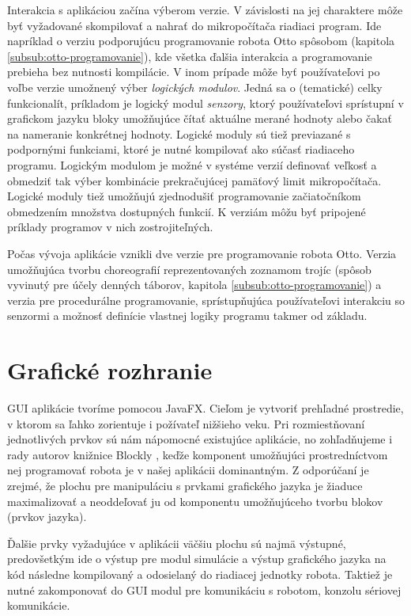 Interakcia s aplikáciou začína výberom verzie. V závislosti na jej charaktere môže byť vyžadované skompilovať a nahrať do mikropočítača riadiaci program. Ide napríklad o verziu podporujúcu programovanie robota Otto spôsobom  (kapitola \ref{subsub:otto-programovanie}), kde všetka ďalšia interakcia a programovanie prebieha bez nutnosti kompilácie. V inom prípade môže byť používateľovi po voľbe verzie umožnený výber \textit{logických modulov}. Jedná sa o (tematické) celky funkcionalít, príkladom je logický modul \textit{senzory}, ktorý používateľovi sprístupní v grafickom jazyku bloky umožňujúce čítať aktuálne merané hodnoty alebo čakať na nameranie konkrétnej hodnoty. Logické moduly sú tiež previazané s podpornými funkciami, ktoré je nutné kompilovať ako súčasť riadiaceho programu. Logickým modulom je možné v systéme verzií definovať veľkosť a obmedziť tak výber kombinácie prekračujúcej pamäťový limit mikropočítača. Logické moduly tiež umožňujú zjednodušiť programovanie začiatočníkom obmedzením množstva dostupných funkcií. K verziám môžu byť pripojené príklady programov v nich zostrojiteľných.

Počas vývoja aplikácie vznikli dve verzie pre programovanie robota Otto. Verzia umožňujúca tvorbu choreografií reprezentovaných zoznamom trojíc (spôsob vyvinutý pre účely denných táborov, kapitola \ref{subsub:otto-programovanie}) a verzia pre procedurálne programovanie, sprístupňujúca používateľovi interakciu so senzormi a možnosť definície vlastnej logiky programu takmer od základu.


\section{Grafické rozhranie}
GUI aplikácie tvoríme pomocou JavaFX. Cieľom je vytvoriť prehľadné prostredie, v ktorom sa ľahko zorientuje i požívateľ nižšieho veku. Pri rozmiestňovaní jednotlivých prvkov sú nám nápomocné existujúce aplikácie, no zohľadňujeme i rady autorov knižnice Blockly \cite{blocklyBestPractices}, keďže komponent umožňujúci prostredníctvom nej programovať robota je v našej aplikácii dominantným. Z odporúčaní je zrejmé, že plochu pre manipuláciu s prvkami grafického jazyka je žiaduce maximalizovať a neoddeľovať ju od komponentu umožňujúceho tvorbu blokov (prvkov jazyka).

Ďalšie prvky vyžadujúce v aplikácii väčšiu plochu sú najmä výstupné, predovšetkým ide o výstup pre modul simulácie a výstup  grafického jazyka na kód následne kompilovaný a odosielaný do riadiacej jednotky robota. Taktiež je nutné zakomponovať do GUI modul pre komunikáciu s robotom, konzolu sériovej komunikácie.

